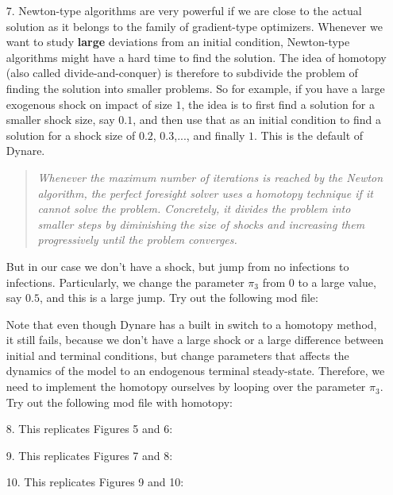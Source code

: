 \begin{itemize}
\item[7.] Newton-type algorithms are very powerful if we are close to the actual solution
  as it belongs to the family of gradient-type optimizers.
Whenever we want to study \textbf{large} deviations from an initial condition,
  Newton-type algorithms might have a hard time to find the solution.
The idea of homotopy (also called divide-and-conquer) is therefore to subdivide the problem of finding the solution into smaller problems.
So for example, if you have a large exogenous shock on impact of size $1$,
  the idea is to first find a solution for a smaller shock size, say $0.1$,
  and then use that as an initial condition to find a solution for a shock size of $0.2$, $0.3$,..., and finally $1$.
This is the default of Dynare.
\begin{quote}
\emph{Whenever the maximum number of iterations is reached by the Newton algorithm,
  the perfect foresight solver uses a homotopy technique if it cannot solve the problem.
Concretely, it divides the problem into smaller steps by diminishing the size of shocks
  and increasing them progressively until the problem converges.}
\end{quote}
But in our case we don't have a shock,
  but jump from no infections to infections.
Particularly, we change the parameter $\pi_3$ from $0$ to a large value, say $0.5$,
  and this is a large jump.
Try out the following mod file:

Note that even though Dynare has a built in switch to a homotopy method,
  it still fails, because we don't have a large shock or a large difference between initial and terminal conditions,
  but change parameters that affects the dynamics of the model to an endogenous terminal steady-state.
Therefore, we need to implement the homotopy ourselves by looping over the parameter $\pi_3$.
Try out the following mod file with homotopy:


\item[8.] This replicates Figures 5 and 6:


\item[9.] This replicates Figures 7 and 8:


\item[10.] This replicates Figures 9 and 10:


\end{itemize}
